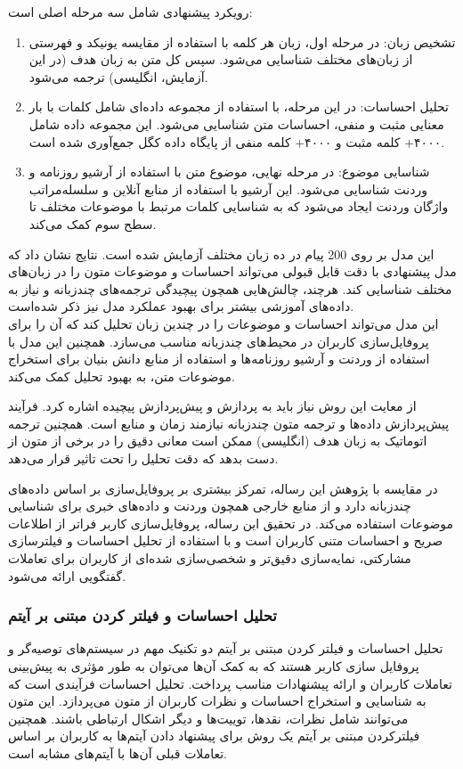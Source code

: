 رویکرد پیشنهادی شامل سه مرحله اصلی است:
\begin{enumerate}
\item
تشخیص زبان: در مرحله اول، زبان هر کلمه با استفاده از مقایسه 
یونیکد%
 و فهرستی از زبان‌های مختلف شناسایی می‌شود. سپس کل متن به زبان هدف (در این آزمایش، انگلیسی) ترجمه می‌شود.
\item
تحلیل احساسات: در این مرحله، با استفاده از مجموعه داده‌ای شامل کلمات با بار معنایی مثبت و منفی، احساسات متن شناسایی می‌شود. این مجموعه داده شامل ۴۰۰۰+ کلمه مثبت و ۴۰۰۰+ کلمه منفی از پایگاه داده 
کگل%
جمع‌آوری شده است.
\item
شناسایی موضوع: در مرحله نهایی، موضوع متن با استفاده از آرشیو روزنامه و وردنت شناسایی می‌شود. این آرشیو با استفاده از منابع آنلاین و سلسله‌مراتب واژگان وردنت ایجاد می‌شود که به شناسایی کلمات مرتبط با موضوعات مختلف تا سطح سوم کمک می‌کند.
\end{enumerate}
این مدل بر روی 200 پیام در ده زبان مختلف آزمایش شده است.
نتایج نشان داد که مدل پیشنهادی با دقت قابل قبولی می‌تواند احساسات و موضوعات متون را در زبان‌های مختلف شناسایی کند. هرچند، چالش‌هایی همچون پیچیدگی ترجمه‌های چندزبانه و نیاز به داده‌های آموزشی بیشتر برای بهبود عملکرد مدل نیز ذکر شده‌است.\\

این مدل می‌تواند احساسات و موضوعات را در چندین زبان تحلیل کند که آن را برای پروفایل‌سازی کاربران در محیط‌های چندزبانه مناسب می‌سازد.
همچنین این مدل با استفاده از وردنت و آرشیو روزنامه‌ها و استفاده از منابع دانش بنیان برای استخراج موضوعات متن، به بهبود تحلیل کمک می‌کند.

از معایت این روش نیاز باید به پردازش و پیش‌پردازش پیچیده اشاره کرد. فرآیند پیش‌پردازش داده‌ها و ترجمه متون چندزبانه نیازمند زمان و منابع است. همچنین ترجمه اتوماتیک به زبان هدف (انگلیسی) ممکن است معانی دقیق را در برخی از متون از دست بدهد که دقت تحلیل را تحت تاثیر قرار می‌دهد.

در مقایسه با پژوهش این رساله،
\cite{nag2023knowledge}
 تمرکز بیشتری بر پروفایل‌سازی بر اساس داده‌های چندزبانه دارد و از منابع خارجی همچون وردنت و داده‌های خبری برای شناسایی موضوعات استفاده می‌کند. در تحقیق این رساله، پروفایل‌سازی کاربر فراتر از اطلاعات صریح و احساسات متنی کاربران است و با استفاده از تحلیل احساسات و فیلترسازی مشارکتی، نمایه‌سازی دقیق‌تر و شخصی‌سازی شده‌ای از کاربران برای تعاملات گفتگویی ارائه می‌شود.



\subsubsection{تحلیل احساسات و فیلتر کردن مبتنی بر آیتم}
تحلیل احساسات و فیلتر کردن مبتنی بر آیتم دو تکنیک مهم در سیستم‌های توصیه‌گر و پروفایل سازی کاربر هستند که به کمک آن‌ها می‌توان به طور مؤثری به پیش‌بینی تعاملات کاربران و ارائه پیشنهادات مناسب پرداخت. 
تحلیل احساسات فرآیندی است که به شناسایی و استخراج احساسات و نظرات کاربران از متون می‌پردازد. این متون می‌توانند شامل نظرات، نقدها، توییت‌ها و دیگر اشکال ارتباطی باشند. همچنین فیلترکردن مبتنی بر آیتم یک روش برای پیشنهاد دادن آیتم‌ها به کاربران بر اساس تعاملات قبلی آن‌ها با آیتم‌های مشابه است.


